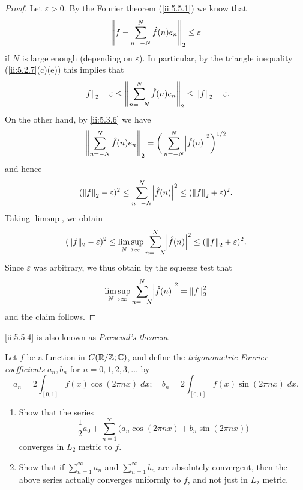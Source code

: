 \begin{proof}
  Let \(\varepsilon > 0\).
  By the Fourier theorem (\cref{ii:5.5.1}) we know that
  \[
    \norm*{f - \sum_{n = -N}^N \hat{f}(n) e_n}_2 \leq \varepsilon
  \]
  if \(N\) is large enough (depending on \(\varepsilon\)).
  In particular, by the triangle inequality (\cref{ii:5.2.7}(c)(e)) this implies that
  \[
    \norm*{f}_2 - \varepsilon \leq \norm*{\sum_{n = -N}^N \hat{f}(n) e_n}_2 \leq \norm*{f}_2 + \varepsilon.
  \]
  On the other hand, by \cref{ii:5.3.6} we have
  \[
    \norm*{\sum_{n = -N}^N \hat{f}(n) e_n}_2 = \bigg(\sum_{n = -N}^N \abs{\hat{f}(n)}^2\bigg)^{1 / 2}
  \]
  and hence
  \[
    (\norm*{f}_2 - \varepsilon)^2 \leq \sum_{n = -N}^N \abs{\hat{f}(n)}^2 \leq (\norm*{f}_2 + \varepsilon)^2.
  \]
  Taking \(\limsup\), we obtain
  \[
    (\norm*{f}_2 - \varepsilon)^2 \leq \limsup_{N \to \infty} \sum_{n = -N}^N \abs{\hat{f}(n)}^2 \leq (\norm*{f}_2 + \varepsilon)^2.
  \]
  Since \(\varepsilon\) was arbitrary, we thus obtain by the squeeze test that
  \[
    \limsup_{N \to \infty} \sum_{n = -N}^N \abs{\hat{f}(n)}^2 = \norm*{f}_2^2
  \]
  and the claim follows.
\end{proof}

\begin{note}
  \cref{ii:5.5.4} is also known as \emph{Parseval's theorem}.
\end{note}

\exercisesection

\begin{ex}\label{ii:ex:5.5.1}
  Let \(f\) be a function in \(C(\R / \Z ; \C)\), and define the \emph{trigonometric Fourier coefficients} \(a_n, b_n\) for \(n = 0, 1, 2, 3, \dots\) by
  \[
    a_n = 2 \int_{[0, 1]} f(x) \cos(2 \pi n x) \; dx; \quad b_n = 2 \int_{[0, 1]} f(x) \sin(2 \pi n x) \; dx.
  \]
  \begin{enumerate}
    \item Show that the series
          \[
            \dfrac{1}{2} a_0 + \sum_{n = 1}^\infty \big(a_n \cos(2 \pi n x) + b_n \sin(2 \pi n x)\big)
          \]
          converges in \(L_2\) metric to \(f\).
    \item Show that if \(\sum_{n = 1}^\infty a_n\) and \(\sum_{n = 1}^\infty b_n\) are absolutely convergent, then the above series actually converges uniformly to \(f\), and not just in \(L_2\) metric.
  \end{enumerate}
\end{ex}

